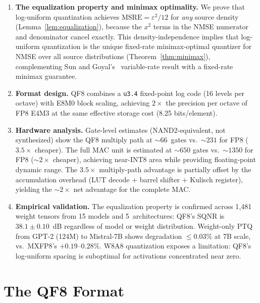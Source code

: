 \documentclass[11pt,letterpaper]{article}
\theoremstyle{definition}
\theoremstyle{remark}
\newcommand{\MSRE}{\mathrm{MSRE}}
\begin{document}
\begin{enumerate}[leftmargin=2em]
  \item \textbf{The equalization property and minimax optimality.}
    We prove that log-uniform quantization achieves
    $\MSRE = \varepsilon^2/12$ for \emph{any} source density
    (Lemma~\ref{lem:equalization}), because the $x^2$ terms in the NMSE
    numerator and denominator cancel exactly.
    This density-independence implies that log-uniform quantization is the
    unique fixed-rate minimax-optimal quantizer for NMSE over all source
    distributions (Theorem~\ref{thm:minimax}), complementing Sun and
    Goyal's~\cite{sun2011} variable-rate result with a fixed-rate minimax guarantee.
  \item \textbf{Format design.}
    QF8 combines a \texttt{u3.4} fixed-point log code (16 levels per octave)
    with E8M0 block scaling, achieving $2\times$ the precision per octave of
    FP8 E4M3 at the same effective storage cost (8.25 bits/element).
  \item \textbf{Hardware analysis.}
    Gate-level estimates (NAND2-equivalent, not synthesized) show the QF8
    multiply path at ${\sim}66$~gates vs.\ ${\sim}231$ for FP8
    ($3.5\times$ cheaper).
    The full MAC unit is estimated at ${\sim}650$ gates vs.\ ${\sim}1350$
    for FP8 (${\sim}2\times$ cheaper), achieving near-INT8 area while providing
    floating-point dynamic range.
    The $3.5\times$ multiply-path advantage is partially offset by the
    accumulation overhead (LUT decode + barrel shifter + Kulisch register),
    yielding the ${\sim}2\times$ net advantage for the complete MAC.
  \item \textbf{Empirical validation.}
    The equalization property is confirmed across 1{,}481 weight tensors from
    15 models and 5~architectures: QF8's SQNR is $38.1 \pm 0.10$~dB regardless
    of model or weight distribution.
    Weight-only PTQ from GPT-2 (124M) to Mistral-7B shows degradation
    ${\leq}0.03\%$ at 7B scale, vs.\ MXFP8's $+0.19$--$0.28\%$.
    W8A8 quantization exposes a limitation: QF8's log-uniform spacing is
    suboptimal for activations concentrated near zero.
\end{enumerate}


\section{The QF8 Format}
\label{sec:format}
\end{document}
